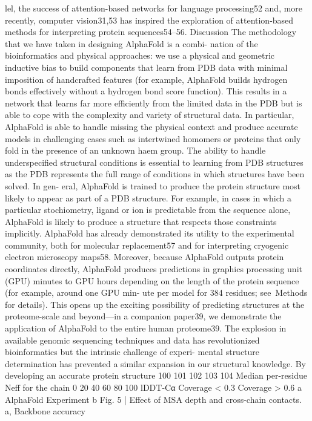 lel, the success of attention-based networks for language processing52
and, more recently, computer vision31,53 has inspired the exploration of
attention-based methods for interpreting protein sequences54–56.
Discussion
The methodology that we have taken in designing AlphaFold is a combi-
nation of the bioinformatics and physical approaches: we use a physical
and geometric inductive bias to build components that learn from PDB
data with minimal imposition of handcrafted features (for example,
AlphaFold builds hydrogen bonds effectively without a hydrogen bond
score function). This results in a network that learns far more efficiently
from the limited data in the PDB but is able to cope with the complexity
and variety of structural data.
In particular, AlphaFold is able to handle missing the physical context
and produce accurate models in challenging cases such as intertwined
homomers or proteins that only fold in the presence of an unknown
haem group. The ability to handle underspecified structural conditions
is essential to learning from PDB structures as the PDB represents the
full range of conditions in which structures have been solved. In gen-
eral, AlphaFold is trained to produce the protein structure most likely
to appear as part of a PDB structure. For example, in cases in which a
particular stochiometry, ligand or ion is predictable from the sequence
alone, AlphaFold is likely to produce a structure that respects those
constraints implicitly.
AlphaFold has already demonstrated its utility to the experimental
community, both for molecular replacement57 and for interpreting
cryogenic electron microscopy maps58. Moreover, because AlphaFold
outputs protein coordinates directly, AlphaFold produces predictions
in graphics processing unit (GPU) minutes to GPU hours depending on
the length of the protein sequence (for example, around one GPU min-
ute per model for 384 residues; see Methods for details). This opens up
the exciting possibility of predicting structures at the proteome-scale
and beyond—in a companion paper39, we demonstrate the application
of AlphaFold to the entire human proteome39.
The explosion in available genomic sequencing techniques and data
has revolutionized bioinformatics but the intrinsic challenge of experi-
mental structure determination has prevented a similar expansion in
our structural knowledge. By developing an accurate protein structure
100
101
102
103
104
Median per-residue Neff for the chain
0
20
40
60
80
100
lDDT-Cα
Coverage < 0.3
Coverage > 0.6
a
AlphaFold Experiment
b
Fig. 5 | Effect of MSA depth and cross-chain contacts. a, Backbone accuracy
